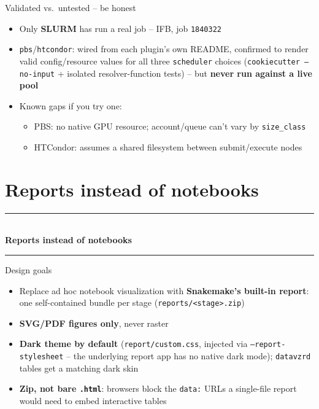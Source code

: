 \documentclass[aspectratio=169]{beamer}
\newcommand{\currentsubsectionname}{}
\newcommand{\sectiondivider}[1]{%
  {\setbeamertemplate{frametitle}{}%
  \begin{frame}
    \vfill
    \begin{center}
      {\color{accent}\rule{0.35\textwidth}{0.6pt}}\\[1.1em]
      {\color{fgtext}\Huge\bfseries #1}\\[1.1em]
      {\color{accent}\rule{0.35\textwidth}{0.6pt}}
    \end{center}
    \vfill
  \end{frame}}%
}
\begin{document}
\begin{frame}{Validated vs.\ untested -- be honest}
  \begin{itemize}
    \item Only \textbf{SLURM} has run a real job -- IFB, job
      \texttt{1840322}
    \item \texttt{pbs}/\texttt{htcondor}: wired from each plugin's own
      README, confirmed to render valid config/resource values for all
      three \texttt{scheduler} choices (\texttt{cookiecutter --no-input} +
      isolated resolver-function tests) -- but \textbf{never run against a
      live pool}
    \item Known gaps if you try one:
      \begin{itemize}
        \item PBS: no native GPU resource; account/queue can't vary by
          \texttt{size\_class}
        \item HTCondor: assumes a shared filesystem between submit/execute
          nodes
      \end{itemize}
  \end{itemize}
\end{frame}

\section{Reports instead of notebooks}
\gdef\currentsubsectionname{}
\sectiondivider{Reports instead of notebooks}

\begin{frame}{Design goals}
  \begin{itemize}
    \item Replace ad hoc notebook visualization with \textbf{Snakemake's
      built-in report}: one self-contained bundle per stage
      (\texttt{reports/<stage>.zip})
    \item \textbf{SVG/PDF figures only}, never raster
    \item \textbf{Dark theme by default} (\texttt{report/custom.css},
      injected via \texttt{--report-stylesheet} -- the underlying report
      app has no native dark mode); \texttt{datavzrd} tables get a
      matching dark skin
    \item[$\Rightarrow$] \textcolor{substrate}{\textbf{Zip, not bare
      \texttt{.html}}}: browsers block the \texttt{data:} URLs a
      single-file report would need to embed interactive tables
  \end{itemize}
\end{frame}
\end{document}
